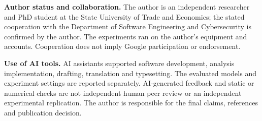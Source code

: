\documentclass[11pt]{article}
\begin{document}
\textbf{Author status and collaboration.} The author is an independent researcher and PhD student at the State University of Trade and Economics; the stated cooperation with the Department of Software Engineering and Cybersecurity is confirmed by the author. The experiments ran on the author's equipment and accounts. Cooperation does not imply Google participation or endorsement.

\textbf{Use of AI tools.} AI assistants supported software development, analysis implementation, drafting, translation and typesetting. The evaluated models and experiment settings are reported separately. AI-generated feedback and static or numerical checks are not independent human peer review or an independent experimental replication. The author is responsible for the final claims, references and publication decision.
\end{document}
